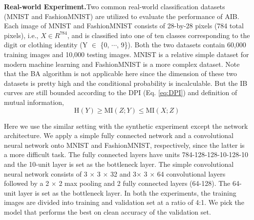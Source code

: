 \documentclass[10pt,journal,compsoc]{IEEEtran}
\begin{document}
\noindent \textbf{Real-world Experiment.}\quad Two common real-world classification datasets (MNIST and FashionMNIST) are utilized to evaluate the performance of AIB. Each image of MNIST and FashionMNIST consists of 28-by-28 pixels (784 total pixels), i.e., $X \in R^{784}$, and is classified into one of ten classes corresponding to the digit or clothing identity (Y $\in$ \{0, $\cdots$, 9\}). Both the two datasets contain 60,000 training images and 10,000 testing images. 
MNIST is a relative simple dataset for modern machine learning and FashionMNIST is a more complex dataset.
Note that the BA algorithm is not applicable here since the dimension of these two datasets is pretty high and the conditional probability is incalculable. But the IB curves are still bounded according to the DPI (Eq. \ref{eq:DPI}) and definition of mutual information,
\begin{equation*}
\mathrm{H}(Y) \geq \mathrm{MI}(Z; Y) \leq \mathrm{MI}(X; Z)
\label{eq:ib_bound}
\end{equation*}

Here we use the similar setting with the synthetic experiment except the network architecture. We apply a simple fully connected network and a convolutional neural network onto MNIST and FashionMNIST, respectively, since the latter is a more difficult task. The fully connected layers have units 784-128-128-10-128-10 and the 10-unit layer is set as the bottleneck layer. The simple convolutional neural network consists of 3 $\times$ 3 $\times$ 32 and 3$\times$ 3 $\times$ 64 convolutional layers followed by a 2 $\times$ 2 max pooling and 2 fully connected layers (64-128). The 64-unit layer is set as the bottleneck layer. In both the experiments, the training images are divided into training and validation set at a ratio of 4:1. We pick the model that performs the best on clean accuracy of the validation set. %
\end{document}

